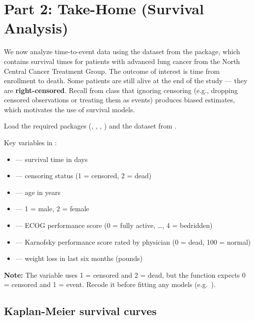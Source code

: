 \newpage

\section{Part 2: Take-Home (Survival Analysis)}

We now analyze time-to-event data using the  dataset from the  package, which contains survival times for patients with advanced lung cancer from the North Central Cancer Treatment Group. The outcome of interest is time from enrollment to death. Some patients are still alive at the end of the study --- they are \textbf{right-censored}. Recall from class that ignoring censoring (e.g., dropping censored observations or treating them as events) produces biased estimates, which motivates the use of survival models.

Load the required packages (, , , ) and the  dataset from .

Key variables in :
\begin{itemize}
  \item {} --- survival time in days
  \item {} --- censoring status (1 = censored, 2 = dead)
  \item {} --- age in years
  \item {} --- 1 = male, 2 = female
  \item {} --- ECOG performance score (0 = fully active, \ldots, 4 = bedridden)
  \item {} --- Karnofsky performance score rated by physician (0 = dead, 100 = normal)
  \item {} --- weight loss in last six months (pounds)
\end{itemize}

\textbf{Note:} The  variable uses 1 = censored and 2 = dead, but the  function expects 0 = censored and 1 = event. Recode it before fitting any models (e.g.\ ).

\subsection{Kaplan-Meier survival curves}

